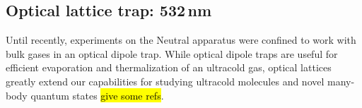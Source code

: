 %
%
%


\pagebreak
\subsection{Optical lattice trap: 532\,nm} \label{ssec:532sys}
Until recently, experiments on the Neutral apparatus were confined to work with bulk gases in an optical dipole trap.
While optical dipole traps are useful for efficient evaporation and thermalization of an ultracold gas, optical lattices greatly extend our capabilities for studying ultracold molecules and novel many-body quantum states \hl{give some refs}.


